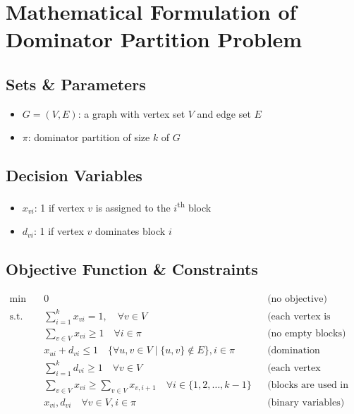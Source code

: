 \section{Mathematical Formulation of Dominator Partition Problem}
\label{sec:dominator_partition_fixed_k}


\subsection*{Sets \& Parameters}
\begin{itemize}[label=, noitemsep]
    \item $G=(V,E)$: a graph with vertex set $V$ and edge set $E$
    \item $\pi$: dominator partition of size $k$ of $G$
\end{itemize}

\subsection*{Decision Variables}
\begin{itemize}[label=, noitemsep]
    \item $x_{vi}$: 1 if vertex $v$ is assigned to the $i$\textsuperscript{th} block
    \item $d_{vi}$: 1 if vertex $v$ dominates block $i$
\end{itemize}

\subsection*{Objective Function \& Constraints}
\begin{align*}
    \min \quad &0 &&\text{(no objective)}\\
    \text{s.t.} \quad
    &\sum_{i=1}^{k} x_{vi} = 1, \quad \forall v \in V &&\text{(each vertex is assigned to one block)}\\
    &\sum_{v \in V} x_{vi} \geq 1 \quad \forall i \in \pi &&\text{(no empty blocks)}\\
    &x_{ui} + d_{vi} \leq 1 \quad \{\forall u, v \in V \mid \{u,v\} \notin E\}, i \in \pi &&\text{(domination condition)}\\
    &\sum_{i=1}^{k} d_{vi} \geq 1 \quad \forall v \in V &&\text{(each vertex dominates at least one block)}\\
    & \sum_{v \in V} x_{vi} \geq \sum_{v \in V} x_{v,i+1} \quad \forall i \in \{1, 2, \dots, k-1\} &&\text{(blocks are used in order)}\\
    &x_{vi}, d_{vi} \quad \forall v \in V, i \in \pi &&\text{(binary variables)}\\
\end{align*}
